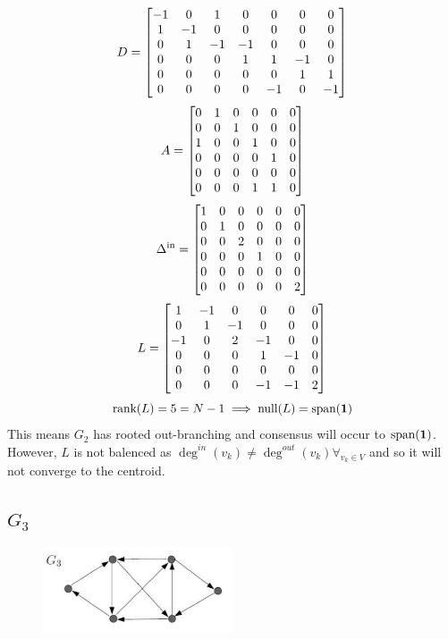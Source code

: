 \documentclass[]{article}
\numberwithin{equation}{section}
\begin{document}
\[
    D = \mqty[
        -1 & 0  & 1  & 0  & 0  & 0  & 0  \\
        1  & -1 & 0  & 0  & 0  & 0  & 0  \\
        0  & 1  & -1 & -1 & 0  & 0  & 0  \\
        0  & 0  & 0  & 1  & 1  & -1 & 0  \\
        0  & 0  & 0  & 0  & 0  & 1  & 1  \\
        0  & 0  & 0  & 0  & -1 & 0  & -1
    ]
\]\[
    A = \mqty[
        0 & 1 & 0 & 0 & 0 & 0 \\
        0 & 0 & 1 & 0 & 0 & 0 \\
        1 & 0 & 0 & 1 & 0 & 0 \\
        0 & 0 & 0 & 0 & 1 & 0 \\
        0 & 0 & 0 & 0 & 0 & 0 \\
        0 & 0 & 0 & 1 & 1 & 0
    ]
\]\[
    \Delta^{\text{in}} = \mqty[
        1 & 0 & 0 & 0 & 0 & 0 \\
        0 & 1 & 0 & 0 & 0 & 0 \\
        0 & 0 & 2 & 0 & 0 & 0 \\
        0 & 0 & 0 & 1 & 0 & 0 \\
        0 & 0 & 0 & 0 & 0 & 0 \\
        0 & 0 & 0 & 0 & 0 & 2
    ]
\]\[
    L = \mqty[
        1  & -1 & 0  & 0  & 0  & 0 \\
        0  & 1  & -1 & 0  & 0  & 0 \\
        -1 & 0  & 2  & -1 & 0  & 0 \\
        0  & 0  & 0  & 1  & -1 & 0 \\
        0  & 0  & 0  & 0  & 0  & 0 \\
        0  & 0  & 0  & -1 & -1 & 2
    ]
\] \[
    \text{rank}(L) = 5 = N-1 \implies \text{null}(L) = \text{span}(\vb{1})
\] This means $G_2$ has rooted out-branching and consensus will occur to $\text{span}(\vb{1})$.
However, $L$ is not balenced as $\deg^{in}(v_k) \neq \deg^{out}(v_k) \forall_{v_k \in V}$ {\color{red} and so it will not converge to the centroid.}

\newpage
\subsection{$G_3$}
\begin{figure}[h]
    \centering
    \includegraphics[width=0.5\textwidth]{figs/pblm6c.png}
\end{figure}
\end{document}
